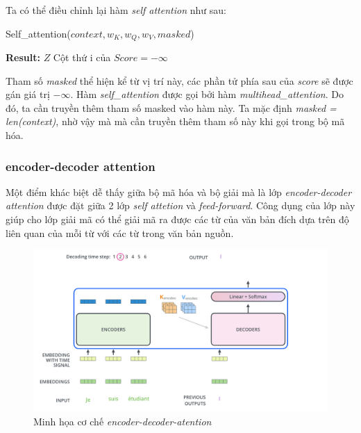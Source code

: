 Ta có thể điều chỉnh lại hàm \textit{self attention} như sau:

\begin{algorithm}[H]
    \caption{Self\_attention($context, w_K, w_Q, w_V, masked$)}
    \begin{algorithmic}[1]
		\State \textbf{Result:} $Z$
			\State Cột thứ i của $Score = -\infty$
		\EndFor
    \end{algorithmic}
\end{algorithm}

Tham số \textit{masked} thể hiện kể từ vị trí này, các phần tử phía sau của \textit{score} sẽ được gán giá trị $-\infty$. Hàm \textit{self\_attention} được gọi bởi hàm \textit{multihead\_attention}. Do đó, ta cần truyền thêm tham số masked vào hàm này. Ta mặc định \textit{masked = len(context)}, nhờ vậy mà mà cần truyền thêm tham số này khi gọi trong bộ mã hóa.


\subsubsection{encoder-decoder attention}
Một điểm khác biệt dễ thấy giữa bộ mã hóa và bộ giải mà là lớp \textit{encoder-decoder attention} được đặt giữa 2 lớp \textit{self attetion} và \textit{feed-forward}. Công dụng của lớp này giúp cho lớp giải mã có thể giải mã ra được các từ của văn bản đích dựa trên độ liên quan của mỗi từ với các từ trong văn bản nguồn. 

\begin{figure}[H]
    \begin{center}
        \includegraphics[scale=0.41]{images/encoder-decoder-attention}
        \caption{Minh họa cơ chế \textit{encoder-decoder-atention} \cite{illustrated.transformer}}
        \label{fig:encoder-decoder-attention}
    \end{center}
\end{figure}

